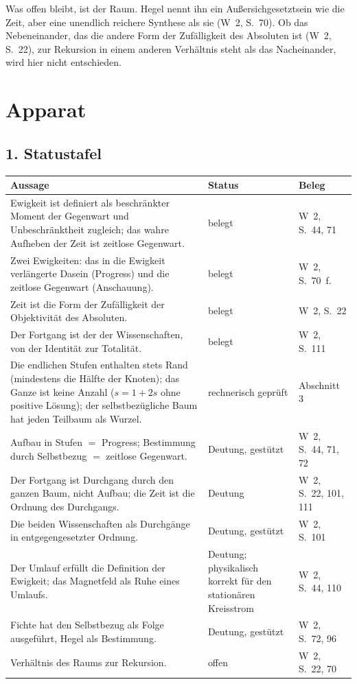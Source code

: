 \documentclass[11pt,a4paper]{article}
\newcommand{\Werke}[1]{(W~2, S.~#1)}
\begin{document}
Was offen bleibt, ist der Raum. Hegel nennt ihn ein Außersichgesetztsein wie die Zeit, aber \glqq eine unendlich reichere Synthese\grqq{} als sie \Werke{70}. Ob das Nebeneinander, das die andere Form der Zufälligkeit des Absoluten ist \Werke{22}, zur Rekursion in einem anderen Verhältnis steht als das Nacheinander, wird hier nicht entschieden.

\clearpage
\section*{Apparat}

\subsection*{1. Statustafel}
\begin{center}
\renewcommand{\arraystretch}{1.3}
\begin{tabular}{@{}R{8.6cm}R{2.6cm}R{3.4cm}@{}}
\toprule
Aussage & Status & Beleg \\
\midrule
Ewigkeit ist definiert als beschränkter Moment der Gegenwart und Unbeschränktheit zugleich; das wahre Aufheben der Zeit ist zeitlose Gegenwart. & belegt & W~2, S.~44, 71 \\
Zwei Ewigkeiten: das in die Ewigkeit verlängerte Dasein (Progress) und die zeitlose Gegenwart (Anschauung). & belegt & W~2, S.~70~f. \\
Zeit ist die Form der Zufälligkeit der Objektivität des Absoluten. & belegt & W~2, S.~22 \\
Der Fortgang ist der der Wissenschaften, von der Identität zur Totalität. & belegt & W~2, S.~111 \\
Die endlichen Stufen enthalten stets Rand (mindestens die Hälfte der Knoten); das Ganze ist keine Anzahl ($s = 1 + 2s$ ohne positive Lösung); der selbstbezügliche Baum hat jeden Teilbaum als Wurzel. & rechnerisch geprüft & Abschnitt 3 \\
Aufbau in Stufen $=$ Progress; Bestimmung durch Selbstbezug $=$ zeitlose Gegenwart. & Deutung, gestützt & W~2, S.~44, 71, 72 \\
Der Fortgang ist Durchgang durch den ganzen Baum, nicht Aufbau; die Zeit ist die Ordnung des Durchgangs. & Deutung & W~2, S.~22, 101, 111 \\
Die beiden Wissenschaften als Durchgänge in entgegengesetzter Ordnung. & Deutung, gestützt & W~2, S.~101 \\
Der Umlauf erfüllt die Definition der Ewigkeit; das Magnetfeld als Ruhe eines Umlaufs. & Deutung; physikalisch korrekt für den stationären Kreisstrom & W~2, S.~44, 110 \\
Fichte hat den Selbstbezug als Folge ausgeführt, Hegel als Bestimmung. & Deutung, gestützt & W~2, S.~72, 96 \\
Verhältnis des Raums zur Rekursion. & offen & W~2, S.~22, 70 \\
\bottomrule
\end{tabular}
\end{center}
\end{document}
